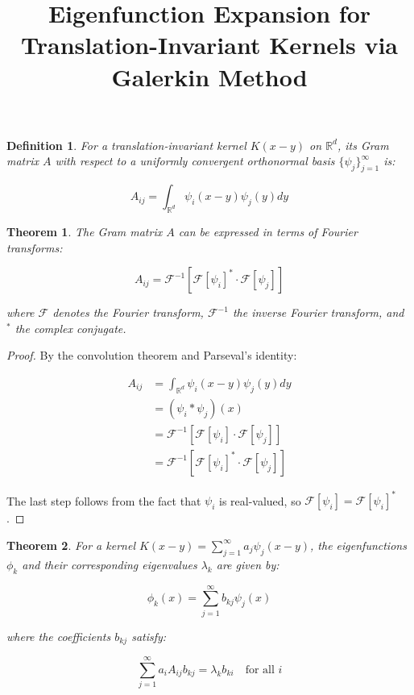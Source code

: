 \documentclass{article}
\newtheorem{theorem}{Theorem}
\newtheorem{definition}{Definition}
\begin{document}
\title{Eigenfunction Expansion for Translation-Invariant Kernels via Galerkin Method}
\author{}
\date{}

\maketitle

\begin{definition}
For a translation-invariant kernel $K(x-y)$ on $\mathbb{R}^d$, its Gram matrix $A$ with respect to a uniformly convergent orthonormal basis $\{\psi_j\}_{j=1}^{\infty}$ is:

\[A_{ij} = \int_{\mathbb{R}^d} \psi_i(x-y)\psi_j(y)dy\]
\end{definition}

\begin{theorem}
The Gram matrix $A$ can be expressed in terms of Fourier transforms:

\[A_{ij} = \mathcal{F}^{-1}[\mathcal{F}[\psi_i]^* \cdot \mathcal{F}[\psi_j]]\]

where $\mathcal{F}$ denotes the Fourier transform, $\mathcal{F}^{-1}$ the inverse Fourier transform, and $^*$ the complex conjugate.
\end{theorem}

\begin{proof}
By the convolution theorem and Parseval's identity:

\begin{align*}
A_{ij} &= \int_{\mathbb{R}^d} \psi_i(x-y)\psi_j(y)dy \\
&= (\psi_i * \psi_j)(x) \\
&= \mathcal{F}^{-1}[\mathcal{F}[\psi_i] \cdot \mathcal{F}[\psi_j]] \\
&= \mathcal{F}^{-1}[\mathcal{F}[\psi_i]^* \cdot \mathcal{F}[\psi_j]]
\end{align*}

The last step follows from the fact that $\psi_i$ is real-valued, so $\mathcal{F}[\psi_i] = \mathcal{F}[\psi_i]^*$.
\end{proof}

\begin{theorem}
For a kernel $K(x-y) = \sum_{j=1}^{\infty} a_j \psi_j(x-y)$, the eigenfunctions $\phi_k$ and their corresponding eigenvalues $\lambda_k$ are given by:

\[\phi_k(x) = \sum_{j=1}^{\infty} b_{kj} \psi_j(x)\]

where the coefficients $b_{kj}$ satisfy:

\[\sum_{j=1}^{\infty} a_i A_{ij} b_{kj} = \lambda_k b_{ki} \quad \text{for all } i\]
\end{theorem}
\end{document}
